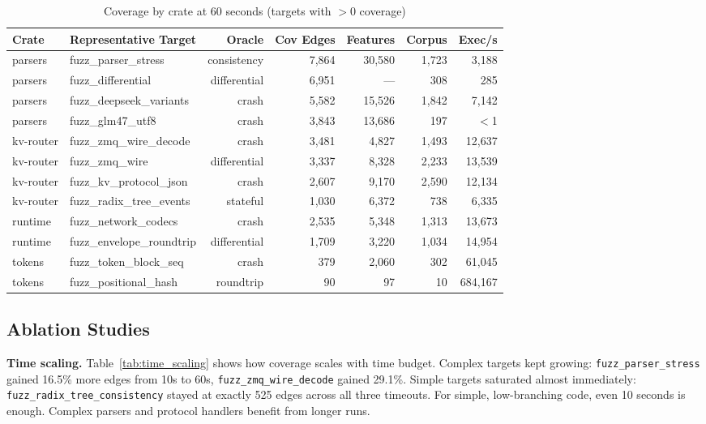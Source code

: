 \documentclass[11pt]{article}
\begin{document}
\begin{table}[H]
\centering
\caption{Coverage by crate at 60 seconds (targets with $>$0 coverage)}
\label{tab:coverage_by_crate}
\footnotesize
\begin{tabular}{@{}llrrrrr@{}}
\toprule
Crate & Representative Target & Oracle & Cov Edges & Features & Corpus & Exec/s \\
\midrule
parsers   & fuzz\_parser\_stress     & consistency  & 7,864  & 30,580 & 1,723 & 3,188 \\
parsers   & fuzz\_differential       & differential & 6,951  & ---    & 308   & 285 \\
parsers   & fuzz\_deepseek\_variants & crash        & 5,582  & 15,526 & 1,842 & 7,142 \\
parsers   & fuzz\_glm47\_utf8        & crash        & 3,843  & 13,686 & 197   & $<$1 \\
\addlinespace
kv-router & fuzz\_zmq\_wire\_decode  & crash        & 3,481  & 4,827  & 1,493 & 12,637 \\
kv-router & fuzz\_zmq\_wire          & differential & 3,337  & 8,328  & 2,233 & 13,539 \\
kv-router & fuzz\_kv\_protocol\_json & crash        & 2,607  & 9,170  & 2,590 & 12,134 \\
kv-router & fuzz\_radix\_tree\_events & stateful    & 1,030  & 6,372  & 738   & 6,335 \\
\addlinespace
runtime   & fuzz\_network\_codecs    & crash        & 2,535  & 5,348  & 1,313 & 13,673 \\
runtime   & fuzz\_envelope\_roundtrip & differential & 1,709 & 3,220  & 1,034 & 14,954 \\
\addlinespace
tokens    & fuzz\_token\_block\_seq  & crash        & 379    & 2,060  & 302   & 61,045 \\
tokens    & fuzz\_positional\_hash   & roundtrip    & 90     & 97     & 10    & 684,167 \\
\bottomrule
\end{tabular}
\end{table}

\subsection{Ablation Studies}

\textbf{Time scaling.} Table~\ref{tab:time_scaling} shows how coverage scales with time budget. Complex targets kept growing: \texttt{fuzz\_parser\_stress} gained 16.5\% more edges from 10s to 60s, \texttt{fuzz\_zmq\_wire\_decode} gained 29.1\%. Simple targets saturated almost immediately: \texttt{fuzz\_radix\_tree\_consistency} stayed at exactly 525 edges across all three timeouts. For simple, low-branching code, even 10 seconds is enough. Complex parsers and protocol handlers benefit from longer runs.
\end{document}
